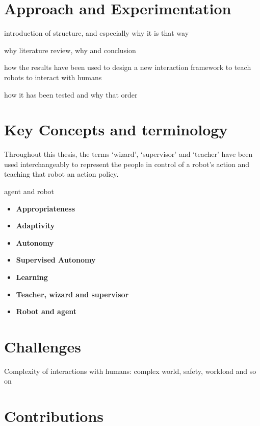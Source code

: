 \section{Approach and Experimentation}\label{sec:intro-exps}

introduction of structure, and especially why it is that way

why literature review, why and conclusion

how the results have been used to design a new interaction framework to teach robots to interact with humans

how it has been tested and why that order

\section{Key Concepts and terminology}\label{sec:intro-concepts}

Throughout this thesis, the terms `wizard', `supervisor' and `teacher' have been used interchangeably to represent the people in control of a robot's action and teaching that robot an action policy.

agent and robot

\begin{itemize}
	\item \textbf{Appropriateness}
	\item \textbf{Adaptivity}
	\item \textbf{Autonomy}
	\item \textbf{Supervised Autonomy}
	\item \textbf{Learning}
	\item \textbf{Teacher, wizard and supervisor}
	\item \textbf{Robot and agent}
\end{itemize}

\section{Challenges}

Complexity of interactions with humans: complex world, safety, workload and so on

\section{Contributions}\label{sec:intro-contr}

